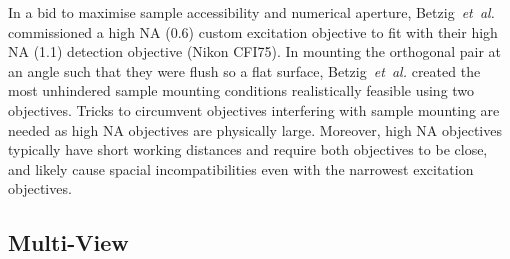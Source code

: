 In a bid to maximise sample accessibility and numerical aperture, Betzig~\emph{et~al.}~\cite{chen_lattice_2014} commissioned a high NA (0.6) custom excitation objective to fit with their high NA (1.1) detection objective (Nikon CFI75).
In mounting the orthogonal pair at an angle such that they were flush so a flat surface, Betzig~\emph{et~al.} created the most unhindered sample mounting conditions realistically feasible using two objectives.
Tricks to circumvent objectives interfering with sample mounting are needed as high NA objectives are physically large.
Moreover,  high NA objectives typically have short working distances and require both objectives to be close, and likely cause spacial incompatibilities even with the narrowest excitation objectives.
%





\subsection{Multi-View}%

